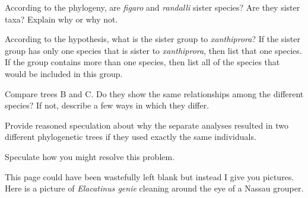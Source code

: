 \documentclass[11pt, addpoints]{exam}
\begin{document}
\begin{questions}

\question[1]
According to the phylogeny, are \emph{figaro} and \emph{randalli}
sister species? Are they sister taxa? Explain why or why not.


\newpage

\question[1]
According to the hypothesis, what is the sister group to
\emph{xanthiprora}? If the sister group has only one species that is
sister to \emph{xanthiprora}, then list that one species. If the group
contains more than one species, then list all of the species that would
be included in this group.



\question[1]
Compare trees B and C. Do they show the same relationships among the
different species? If not, describe a few ways in which they differ.


\question[1]
Provide reasoned speculation about why the separate analyses
resulted in two different phylogenetic trees if they used exactly the
same individuals.


\question[1]
Speculate how you might resolve this problem.


\end{questions}

\newpage

\noindent This page could have been wastefully left blank but instead I give you
 pictures. Here is a picture of \emph{Elacatinus genie} cleaning
around the eye of a Nassau grouper.
\end{document}
